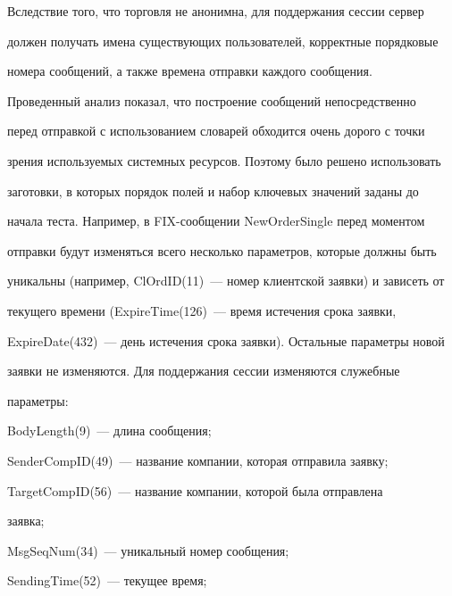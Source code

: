 \vspace*{-2pt}





  Вследствие того, что торговля не анонимна, для поддержания сессии сервер


должен получать имена существующих пользователей, корректные порядковые


номера сообщений, а также времена отправки каждого сообщения.


Проведенный анализ показал, что построение сообщений непосредственно


перед отправкой с использованием словарей обходится очень дорого с точки


зрения используемых системных ресурсов. Поэтому было решено использовать


заготовки, в которых порядок полей и набор ключевых значений заданы до


начала теста. Например, в FIX-со\-об\-ще\-нии {\sf NewOrderSingle} перед моментом


отправки будут изменяться всего несколько параметров, которые должны быть


уникальны (например, ClOrdID(11)~--- номер клиентской заявки) и зависеть от


текущего времени {\sf (ExpireTime(126)}~--- время истечения срока заявки,


{\sf ExpireDate(432)}~--- день истечения срока заявки). Остальные параметры новой


заявки не изменяются. Для поддержания сессии изменяются служебные


параметры:





 {\sf BodyLength}(9)~--- длина сообщения;





{\sf SenderCompID}(49)~--- название компании, которая отправила заявку;





{\sf TargetCompID}(56)~--- название компании, которой была отправлена


заявка;





{\sf MsgSeqNum}(34)~--- уникальный номер сообщения;





{\sf SendingTime}(52)~--- текущее время;





